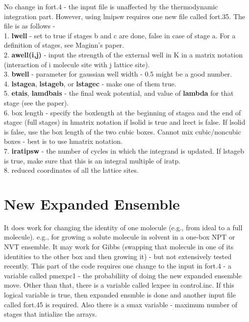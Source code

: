 \documentclass[12pt,letterpaper]{article}
\begin{document}
{{{{{{\noindent  No change in fort.4 - the input file is unaffected by the thermodynamic
integration part. However, using lmipsw requires one new file called
fort.35. The file is as follows -\\
1. {\bf lwell} - set to true if stages b and c are done, false in case of stage a.
For a definition of stages, see Maginn's paper.\\
2. {\bf awell(i,j)} - input the strength of the external well in K in a
 matrix notation (interaction of i molecule site with j lattice site). \\
3. {\bf bwell} - parameter for gaussian well width - 0.5 might be a good
 number. \\
4. {\bf lstagea}, {\bf lstageb}, or {\bf lstagec} - make one of them true.\\
5. {\bf etais}, {\bf lamdbais} - the final weak potential, and value of {\bf lambda} for
 that stage (see the paper).\\ 
6. box length - specify the boxlength at the beginning of stagea and
 the end of stagec (full stages) in hmatrix notation if lsolid is true
 and lrect is false. If lsolid is false, use the box length of the two
 cubic boxes. Cannot mix cubic/noncubic boxes - best is to use 
 hmatrix notation. \\
7. {\bf iratipsw} - the number of cycles in which the integrand is updated.
 If lstageb is true, make sure that this is an integral multiple
 of iratp.\\
8. reduced coordinates of all the lattice sites.

\section{New Expanded Ensemble}
\noindent It does work for changing the identity of one molecule (e.g., from ideal
to a full molecule). e.g., for growing a solute molecule in solvent
in a one-box NPT or NVT ensemble. It may work for Gibbs (swapping
that molecule in one of its identities to the other box and then
growing it) - but not extensively tested recently. This part of the
code requires one change to the input in fort.4 - a variable
called pmexpc1 - the probabiliity of doing the new expanded ensemble
move. Other than that, there is a variable called lexpee in control.inc.
If this logical variable is true, then expanded ensmble is done and another
input file called fort.45 is required. Also there is a smax variable -
maximum number of stages that intialize the arrays.

}}}}}}
\end{document}
